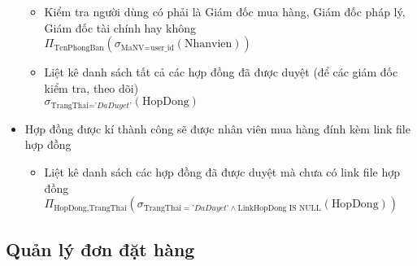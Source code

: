 \documentclass{article}
\begin{document}
\begin{itemize}
\begin{itemize}
				\item Kiểm tra người dùng có phải là Giám đốc mua hàng, Giám đốc pháp lý,
					Giám đốc tài chính hay không\\
					$\Pi_{\text{TenPhongBan}}(\sigma_{\text{MaNV=user\_id}}(\text{Nhanvien}
					))$

				\item Liệt kê danh sách tất cả các hợp đồng đã được duyệt (để các giám
					đốc kiểm tra, theo dõi)\\ $\sigma_{\text{TrangThai=}\textit{'DaDuyet'}}
					(\text{HopDong})$
			\end{itemize}

		\item Hợp đồng được kí thành công sẽ được nhân viên mua hàng đính kèm link file
			hợp đồng
			\begin{itemize}
				\item Liệt kê danh sách các hợp đồng đã được duyệt mà chưa có link file hợp
					đồng
					\newline
					$\Pi_{\text{HopDong,TrangThai}}(\sigma_{\text{TrangThai} = \textit{'DaDuyet'}
					\wedge \text{LinkHopDong} \text{ IS NULL}}(\text{HopDong}))$
			\end{itemize}
	\end{itemize}
	\subsection{Quản lý đơn đặt hàng}
\end{document}
